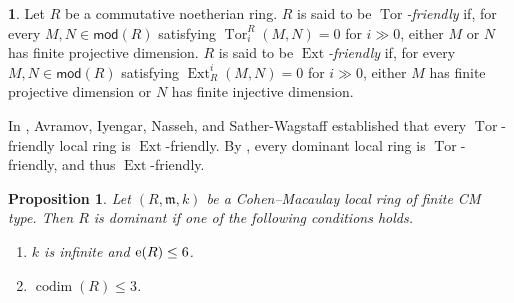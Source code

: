 \documentclass{amsart}
\newcommand{\0}{{\bf{0}}}
\newcommand{\m}{\mathfrak{m}}
\DeclareMathOperator{\Ext}{Ext}
\DeclareMathOperator{\Tor}{Tor}
\DeclareMathOperator{\codim}{codim}
\newcommand{\mo}{\mathsf{mod}}
\newtheorem{proposition}[theorem]{Proposition}
\theoremstyle{definition}
\newtheorem{chunk}[theorem]{}
\begin{document}
\begin{chunk}\label{Tor-friendly}
Let $R$ be a commutative noetherian ring.    
$R$ is said to be \emph{$\Tor$-friendly} if, for every $M,N\in\mo(R)$ satisfying
$\Tor^R_i(M,N)=0$ for $i\gg 0$, either $M$ or $N$ has finite projective dimension.
$R$ is said to be \emph{$\Ext$-friendly} if, for every $M,N\in\mo(R)$ satisfying
$\Ext^i_R(M,N)=0$ for $i\gg0$, either $M$ has finite projective dimension or $N$ has finite injective dimension.

In \cite[Proposition 5.5]{AINSW}, Avramov, Iyengar, Nasseh, and Sather-Wagstaff established that every $\Tor$-friendly local ring is $\Ext$-friendly. By \cite[Theorem 6.7]{Takahashi:2023}, every dominant local ring is $\Tor$-friendly, and thus $\Ext$-friendly.
\end{chunk}
 

\begin{proposition}\label{two cases}
    Let $(R,\m,k)$ be a Cohen--Macaulay local ring of finite CM type.  Then $R$ is dominant if one of the following conditions holds.
    \begin{enumerate}
        \item  $k$ is infinite and ${\rm e}(R)\leq 6$.

        \item  $\codim(R)\leq 3$. 
    \end{enumerate}
\end{proposition}
\end{document}
